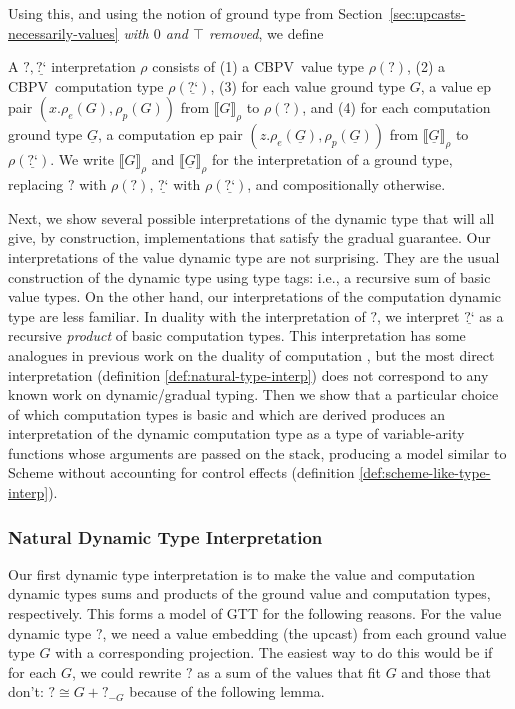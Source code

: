 \documentclass[acmsmall,screen,12pt]{acmart}
\renewcommand{\u}{\underline}
\newcommand{\cbpv}{CBPV}
\newcommand{\cbpvtxt}{\cbpv}
\newcommand{\sem}[1]{\llbracket#1\rrbracket}
\newcommand{\srho}[1]{\sem{#1}_\rho}
\newcommand{\dynv}{{?}}
\newcommand{\dync}{\u {\text{?`}}}
\begin{document}
Using this, and using the notion of ground type from
Section~\ref{sec:upcasts-necessarily-values} \emph{with $0$ and $\top$ removed}, we define

\begin{definition}
  A $\dynv,\dync$ interpretation $\rho$ consists of (1) a
  \cbpvtxt\ value type $\rho(\dynv)$, (2) a \cbpvtxt\ computation
  type $\rho(\dync)$, 
  (3)
  for each value ground type $G$,
  a value ep pair $(x.\rho_{e}(G), \rho_{p}(G))$ from $\srho G$ to
  $\rho(\dynv)$, and (4) for each computation ground type $\u G$, a
  computation ep pair $(z.\rho_{e}(\u G), \rho_{p}(\u G))$ from
  $\srho{\u G}$ to $\rho(\dync)$.  We write 
  $\srho G$ and $\srho {\u G}$ for the interpretation of a ground type,
  replacing $\dynv$ with $\rho(\dynv)$, $\dync$ with $\rho(\dync)$, and
  compositionally otherwise.
\end{definition}

Next, we show several possible interpretations of the dynamic type
that will all give, by construction, implementations that satisfy the
gradual guarantee.
%
Our interpretations of the value dynamic type are not surprising.
%
They are the usual construction of the dynamic type using type tags:
i.e., a recursive sum of basic value types.
%
On the other hand, our interpretations of the computation dynamic type
are less familiar.
%
In duality with the interpretation of $\dynv$, we interpret $\dync$ as
a recursive \emph{product} of basic computation types.
%
This interpretation has some analogues in previous work on the duality
of computation \citep{girard01locussolum,zeilberger09thesis}, but the
most direct interpretation (definition \ref{def:natural-type-interp})
does not correspond to any known work on dynamic/gradual typing.
%
Then we show that a particular choice of which computation types is
basic and which are derived produces an interpretation of the dynamic
computation type as a type of variable-arity functions whose arguments
are passed on the stack, producing a model similar to Scheme without
accounting for control effects (definition
\ref{def:scheme-like-type-interp}).

\subsubsection{Natural Dynamic Type Interpretation}

Our first dynamic type interpretation is to make the value and
computation dynamic types sums and products of the ground value and
computation types, respectively.
%
This forms a model of GTT for the following reasons.
%
For the value dynamic type $\dynv$, we need a value embedding (the
upcast) from each ground value type $G$ with a corresponding projection.
%
The easiest way to do this would be if for each $G$, we could rewrite
$\dynv$ as a sum of the values that fit $G$ and those that don't:
$\dynv \cong G + \dynv_{-G}$ because of the following lemma.
\end{document}
